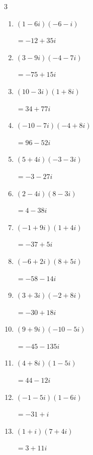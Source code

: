 \begin{multicols}{3}
\begin{enumerate}
        $\displaystyle =-33-111i$

  \item $\displaystyle (1-6i)(-6-i)$

        $\displaystyle =-12+35i$

\columnbreak %

  \item $\displaystyle (3-9i)(-4-7i)$

        $\displaystyle =-75+15i$

  \item $\displaystyle (10-3i)(1+8i)$

        $\displaystyle =34+77i$

  \item $\displaystyle (-10-7i)(-4+8i)$

        $\displaystyle =96-52i$

  \item $\displaystyle (5+4i)(-3-3i)$

        $\displaystyle =-3-27i$

  \item $\displaystyle (2-4i)(8-3i)$

        $\displaystyle =4-38i$

  \item $\displaystyle (-1+9i)(1+4i)$

        $\displaystyle =-37+5i$

  \item $\displaystyle (-6+2i)(8+5i)$

        $\displaystyle =-58-14i$

  \item $\displaystyle (3+3i)(-2+8i)$

        $\displaystyle =-30+18i$

  \item $\displaystyle (9+9i)(-10-5i)$

        $\displaystyle =-45-135i$

  \item $\displaystyle (4+8i)(1-5i)$

        $\displaystyle =44-12i$

  \item $\displaystyle (-1-5i)(1-6i)$

        $\displaystyle =-31+i$

  \item $\displaystyle (1+i)(7+4i)$

        $\displaystyle =3+11i$


\end{enumerate}
\end{multicols}
